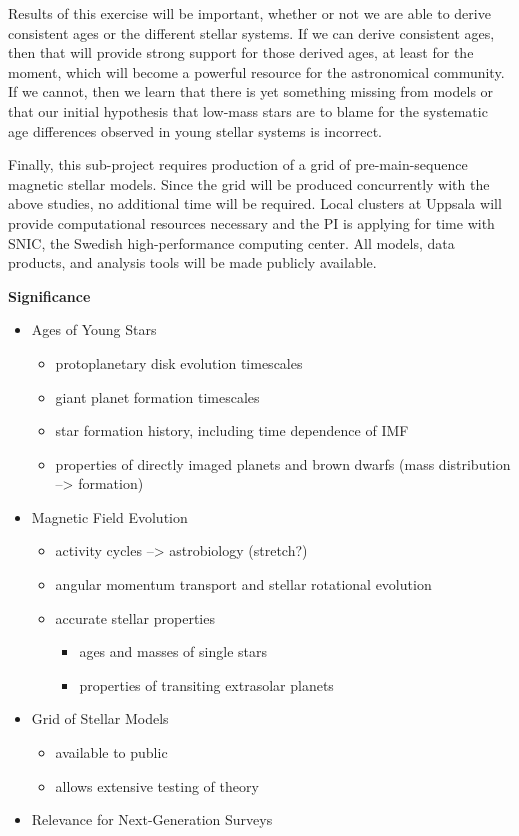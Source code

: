 \documentclass[12pt,a4paper]{article}
\begin{document}
Results of this exercise will be important, whether or not we are able to derive consistent ages or the different stellar systems. If we can derive consistent ages, then that will provide strong support for those derived ages, at least for the moment, which will become a powerful resource for the astronomical community. If we cannot, then we learn that there is yet something missing from models or that our initial hypothesis that low-mass stars are to blame for the systematic age differences observed in young stellar systems is incorrect.


Finally, this sub-project requires production of a grid of pre-main-sequence magnetic stellar models. Since the grid will be produced concurrently with the above studies, no additional time will be required. Local clusters at Uppsala will provide computational resources necessary and the PI is applying for time with SNIC, the Swedish high-performance computing center. All models, data products, and analysis tools will be made publicly available.

\clearpage

{\bf \large Significance}
\begin{itemize}
  \item Ages of Young Stars
  	\begin{itemize}
    	\item protoplanetary disk evolution timescales
    	\item giant planet formation timescales
    	\item star formation history, including time dependence of IMF
    	\item properties of directly imaged planets and brown dwarfs (mass distribution --> formation)
  	\end{itemize}
  \item Magnetic Field Evolution
  	\begin{itemize}
    	\item activity cycles --> astrobiology (stretch?)
    	\item angular momentum transport and stellar rotational evolution
    	\item accurate stellar properties
		\begin{itemize}
      		\item ages and masses of single stars
      		\item properties of transiting extrasolar planets
		\end{itemize}
     \end{itemize}
  \item Grid of Stellar Models
  	\begin{itemize}
		\item available to public
    	\item allows extensive testing of theory
	\end{itemize}
  \item Relevance for Next-Generation Surveys
\end{itemize}
\end{document}
